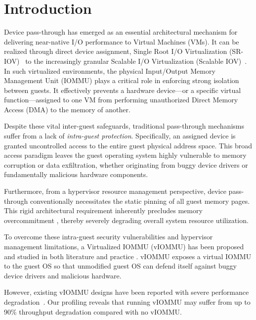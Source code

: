 \section{Introduction}
Device pass-through
has emerged as an essential architectural mechanism 
for delivering near-native I/O performance 
to Virtual Machines (VMs).
It can be realized through direct device assignment,
Single Root I/O Virtualization (SR-IOV)~\cite{ms_sriov_overview, intel_sriov_ethernet, amd_sriov_mxgpu}
to the increasingly granular Scalable I/O Virtualization (Scalable IOV)~\cite{intel_scalable_iov_spec}.
In such virtualized environments, 
the physical Input/Output Memory Management Unit (IOMMU) 
plays a critical role in enforcing strong isolation between guests. 
It effectively prevents a hardware device---or a specific virtual function---assigned to one VM 
from performing unauthorized Direct Memory Access (DMA) 
to the memory of another.

Despite these vital inter-guest safeguards, 
traditional pass-through mechanisms 
suffer from a lack of \emph{intra-guest protection}\cite{Amit2011vIOMMU,Tian2020coIOMMU,Lv2022LAvIOMMU}. 
Specifically, an assigned device is granted 
uncontrolled access to the entire guest physical address space. 
This broad access paradigm leaves the guest operating system 
highly vulnerable to memory corruption or data exfiltration, 
whether originating from buggy device drivers 
or fundamentally malicious hardware components\cite{Amit2011vIOMMU, RajapakshaIOMMU, AlexCodeInjection}.

Furthermore, from a hypervisor resource management perspective, 
device pass-through conventionally necessitates 
the static pinning of all guest memory pages. 
This rigid architectural requirement 
inherently precludes memory overcommitment \cite{Wang2025ToPRI,Guo2024VPRI}, 
thereby severely degrading overall system resource utilization.

To overcome these intra-guest security vulnerabilities 
and hypervisor management limitations, 
a Virtualized IOMMU (vIOMMU) 
has been proposed and studied in both literature \cite{Amit2011vIOMMU,Tian2020coIOMMU} and practice \cite{qemu_10_0,qemu_vtd}. 
vIOMMU exposes a virtual IOMMU to the guest OS so that unmodified guest OS can defend itself against buggy device drivers and malicious hardware.

However, existing vIOMMU designs
have been reported with severe performance degradation~\cite{Wang2025ToPRI,Tian2020coIOMMU,Amit2011vIOMMU}.
Our profiling reveals that running vIOMMU may suffer from up to 90\% throughput degradation compared with no vIOMMU.

